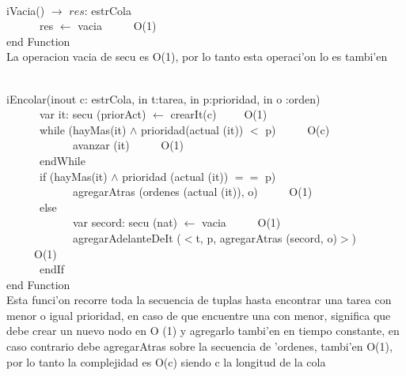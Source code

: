 \documentclass[a4paper,10pt]{article}
\begin{document}
\begin{algoritmo}
\caption{}\\
  iVacia() $\rightarrow$ $res$: estrCola \\
	\indent \ \ \ \ \ \  res $\gets$ vacia  \ \ \ \ \ O(1)\\
    end Function \\
   
   La operacion vacia de secu es O(1), por lo tanto esta operaci'on lo es tambi'en
\end{algoritmo}

\begin{algoritmo}
\caption{}\\
  iEncolar(inout c: estrCola, in t:tarea, in p:prioridad, in o :orden)\\
	\indent \ \ \ \ \ \ var it: secu (priorAct) $\gets$ crearIt(c)\ \ \ \ \ O(1)\\
	\indent \ \ \ \ \ \ while (hayMas(it) $\wedge$ prioridad(actual (it)) $<$ p) \ \ \ \ \ O(c)\\
	\indent \ \ \ \ \ \ \ \ \ \ \ \  avanzar (it) \ \ \ \ \ O(1)\\
	\indent \ \ \ \ \ \ endWhile \ \ \ \ \ \\
	\indent \ \ \ \ \ \ if (hayMas(it) $\wedge$ prioridad (actual (it)) $==$ p)  \ \ \ \ \ \\
	\indent \ \ \ \ \ \ \ \ \ \ \ \  agregarAtras (ordenes (actual (it)), o) \ \ \ \ \ O(1)\\
	\indent \ \ \ \ \ \ else\ \ \ \ \ \\
	\indent \ \ \ \ \ \ \ \ \ \ \ \  var secord: secu (nat) $\gets$ vacia \ \ \ \ \ O(1)\\
	\indent \ \ \ \ \ \ \ \ \ \ \ \  agregarAdelanteDeIt ($<$t, p, agregarAtras (secord, o)$>$) \ \ \ \ \ O(1)\\
	\indent \ \ \ \ \ \ endIf \ \ \ \ \ \\
    end Function \\
   
   Esta funci'on recorre toda la secuencia de tuplas hasta encontrar una tarea con menor o igual prioridad, en caso de que encuentre una con menor, significa que debe crear un nuevo nodo en O (1) y agregarlo tambi'en en tiempo constante, en caso contrario debe agregarAtras sobre la secuencia de 'ordenes, tambi'en O(1), por lo tanto la complejidad es O(c) siendo c la longitud de la cola 
   
   
\end{algoritmo}
\end{document}
